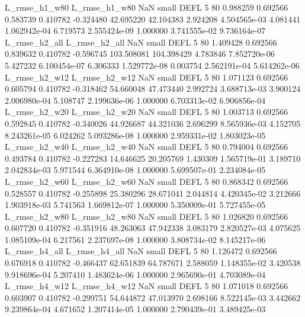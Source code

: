  L_rmse_h1_w80  L_rmse_h1_w80                   NaN      small     DEFL                 5 80 0.988259       0.692566 0.583739       0.410782   -0.324480     42.695220     42.104383     2.924208   4.504565e-03  4.081441 1.062942e-04     6.719573   2.555424e-09            1.000000    3.741555e-02        9.736164e-07
 L_rmse_h2_all  L_rmse_h2_all                   NaN      small     DEFL                 5 80 1.409428       0.692566 0.839632       0.410782   -0.596745    103.508081    104.398429     4.783846   7.852720e-06  5.427232 6.100454e-07     6.306333   1.529772e-08            0.003754    2.562191e-04        5.614262e-06
 L_rmse_h2_w12  L_rmse_h2_w12                   NaN      small     DEFL                 5 80 1.071123       0.692566 0.605794       0.410782   -0.318462     54.660048     47.473440     2.992724   3.688713e-03  3.900124 2.006980e-04     5.108747   2.199636e-06            1.000000    6.703313e-02        6.906856e-04
 L_rmse_h2_w20  L_rmse_h2_w20                   NaN      small     DEFL                 5 80 1.003713       0.692566 0.592845       0.410782   -0.340026     44.926687     44.321036     2.696299   8.565936e-03  4.152705 8.243261e-05     6.024262   5.093286e-08            1.000000    2.959331e-02        1.803023e-05
 L_rmse_h2_w40  L_rmse_h2_w40                   NaN      small     DEFL                 5 80 0.794004       0.692566 0.493784       0.410782   -0.227283     14.646625     20.205769     1.430309   1.565719e-01  3.189710 2.042834e-03     5.971544   6.364910e-08            1.000000    5.699507e-01        2.234084e-05
 L_rmse_h2_w60  L_rmse_h2_w60                   NaN      small     DEFL                 5 80 0.868342       0.692566 0.528557       0.410782   -0.255898     25.380296     28.671041     2.044814   4.420345e-02  3.212666 1.903918e-03     5.741563   1.669812e-07            1.000000    5.350009e-01        5.727455e-05
 L_rmse_h2_w80  L_rmse_h2_w80                   NaN      small     DEFL                 5 80 1.026820       0.692566 0.607720       0.410782   -0.351916     48.263063     47.942338     3.083179   2.820527e-03  4.075625 1.085109e-04     6.217561   2.237697e-08            1.000000    3.808734e-02        8.145217e-06
 L_rmse_h4_all  L_rmse_h4_all                   NaN      small     DEFL                 5 80 1.126472       0.692566 0.676918       0.410782   -0.466437     62.651839     64.787671     2.588059   1.148355e-02  3.420538 9.918696e-04     5.207410   1.483624e-06            1.000000    2.965690e-01        4.703089e-04
 L_rmse_h4_w12  L_rmse_h4_w12                   NaN      small     DEFL                 5 80 1.071018       0.692566 0.603907       0.410782   -0.299751     54.644872     47.013970     2.698166   8.522145e-03  3.442662 9.239864e-04     4.671652   1.207414e-05            1.000000    2.790439e-01        3.489425e-03
